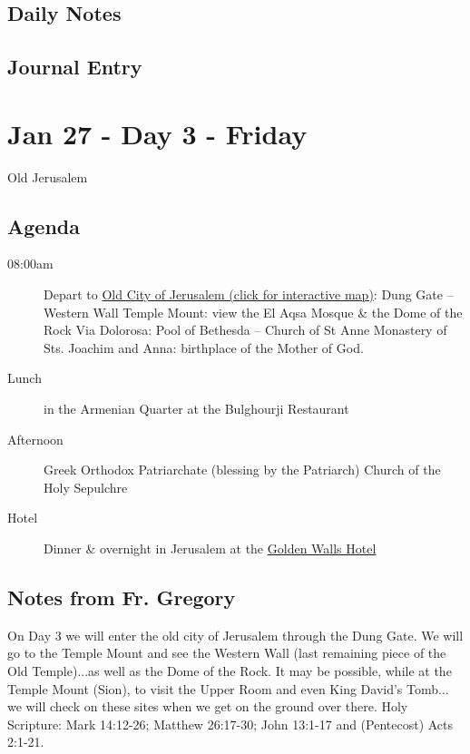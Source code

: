 \documentclass[letterpaper]{report}
\begin{document}
\clearpage
\subsection{Daily Notes}

\clearpage
\subsection{Journal Entry}

\clearpage
\section{Jan 27 - Day 3 - Friday}
Old Jerusalem
\subsection{Agenda}
\begin{description}
	\item[08:00am] Depart to  \href{http://jerusalem.com/map#!/explore/view}{
			Old City of Jerusalem (click for interactive map)}:
		\subitem Dung Gate – Western Wall
		\subitem Temple Mount:
		    view the El Aqsa Mosque \& the Dome of the Rock 
		\subitem Via Dolorosa:
		    Pool of Bethesda -- Church of St Anne
		\subitem Monastery of Sts. Joachim and Anna:
		    birthplace of the Mother of God.
	\item[Lunch] in the Armenian Quarter at the Bulghourji Restaurant 
	\item[Afternoon] Greek Orthodox Patriarchate (blessing by the Patriarch) 
		\subitem Church of the Holy Sepulchre
	\item[Hotel] Dinner \& overnight in Jerusalem at the
	  \href{http://goldenwalls.com/}{Golden Walls Hotel}
\end{description}

\subsection{Notes from Fr. Gregory}
On Day 3 we will enter the old city of Jerusalem through the Dung Gate.
We will go to the Temple Mount and see the Western Wall
(last remaining piece of the Old Temple)...as well as the Dome of the Rock.
It may be possible, while at the Temple Mount (Sion),
to visit the Upper Room and even King David's Tomb...
we will check on these sites when we get on the ground over there.
Holy Scripture: Mark 14:12-26; Matthew 26:17-30;
John 13:1-17 and (Pentecost) Acts 2:1-21.
\end{document}
